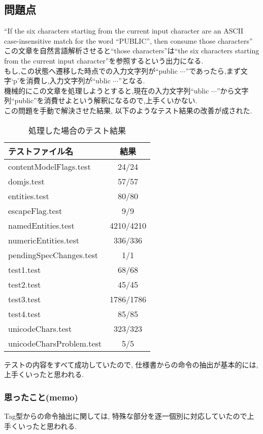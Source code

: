 \documentclass[uplatex,a4j]{jsreport}
\begin{document}

\subsection{問題点}
``If the six characters starting from the current input character are an ASCII case-insensitive match for the word ``PUBLIC'', then consume those characters''
この文章を自然言語解析させると``those characters''は``the six characters starting from the current input character''を参照するという出力になる.\\
もし,この状態へ遷移した時点での入力文字列が``public $\cdots$''であったら,まず文字`p'を消費し,入力文字列が``ublic $\cdots$''となる.\\
機械的にこの文章を処理しようとすると,現在の入力文字列``ublic $\cdots$''から文字列``public''を消費せよという解釈になるので,上手くいかない.\\
この問題を手動で解決させた結果, 以下のようなテスト結果の改善が成された.\\
\begin{table}[htb]
  \begin{center}
    \label{Consumeの処理}
    \caption{処理した場合のテスト結果}
    \begin{tabular}{|l|c|} \hline
      テストファイル名 & 結果 \\ \hline 
      contentModelFlags.test & 24/24  \\
      domjs.test & 57/57  \\
      entities.test & 80/80 \\
      escapeFlag.test & 9/9 \\
      namedEntities.test & 4210/4210 \\
      numericEntities.test & 336/336 \\
      pendingSpecChanges.test & 1/1 \\
      test1.test & 68/68  \\
      test2.test & 45/45 \\
      test3.test & 1786/1786 \\
      test4.test & 85/85 \\ 
      unicodeChars.test & 323/323 \\
      unicodeCharsProblem.test & 5/5 \\ \hline 
    \end{tabular}
  \end{center}
\end{table}
テストの内容をすべて成功していたので, 
仕様書からの命令の抽出が基本的には, 上手くいったと思われる. 

\subsubsection*{思ったこと(memo)}
Tag型からの命令抽出に関しては, 特殊な部分を逐一個別に対応していたので上手くいったと思われる.%
\end{document}
